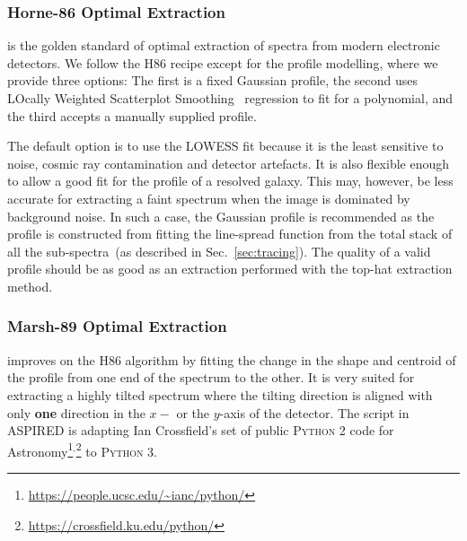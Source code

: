 \documentclass[fleqn,usenatbib]{mnras}
\begin{document}
\subsubsection*{Horne-86 Optimal Extraction}
\citet[hereafter H86]{1986PASP...98..609H} is the golden standard
of optimal extraction of spectra from modern electronic detectors.
We follow the H86 recipe except for the profile modelling,
where we provide three options: The first is a fixed Gaussian
profile, the second uses LOcally Weighted Scatterplot
Smoothing~\citep[LOWESS]{doi:10.1080/01621459.1979.10481038}
regression to fit for a polynomial, and the third accepts
a manually supplied profile.

The default option is to use the LOWESS fit because it is the
least sensitive to noise, cosmic ray contamination and detector
artefacts. It is also flexible enough to allow a good fit for
the profile of a resolved galaxy. This may, however, be less
accurate for extracting a faint spectrum when the image is
dominated by background noise. In such a case, the Gaussian
profile is recommended as the profile is constructed from fitting
the line-spread function from the total stack of all the
sub-spectra~(as described in Sec.~\ref{sec:tracing}). The quality
of a valid profile should be as good as an extraction
performed with the top-hat extraction method.

\subsubsection*{Marsh-89 Optimal Extraction}
\citet[hereafter M89]{1989PASP..101.1032M} improves on the H86
algorithm by fitting the change in the shape and centroid of the
profile from one end of the spectrum to the other. It is very
suited for extracting a highly tilted spectrum where the tilting
direction is aligned with only \textbf{one} direction in the $x-$
or the $y$-axis of the detector. The script in \textsc{ASPIRED}
is adapting Ian Crossfield's set of public
\textsc{Python 2} code for Astronomy\footnote{\url{https://people.ucsc.edu/~ianc/python/}}$^,$\footnote{\url{https://crossfield.ku.edu/python/}}
to \textsc{Python 3}.
\end{document}
